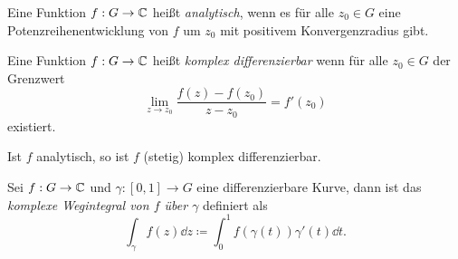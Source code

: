 \begin{definition}
    Eine Funktion $f : G \to \mathbb{C}$ heißt \emph{analytisch}, wenn es für alle $z_0 \in G$ eine Potenzreihenentwicklung von $f$ um $z_0$ mit positivem Konvergenzradius gibt.

    Eine Funktion $f : G \to \mathbb{C}$ heißt \emph{komplex differenzierbar} wenn für alle $z_0 \in G$ der Grenzwert
    $$ \lim_{z \to z_0} \frac{f(z) - f(z_0)}{z - z_0} = f'(z_0) $$
    existiert.
\end{definition}

\begin{remark}
    Ist $f$ analytisch, so ist $f$ (stetig) komplex differenzierbar.
\end{remark}

\begin{definition}
    Sei $f : G \to \mathbb{C}$ und $\gamma : [0,1] \to G$ eine differenzierbare Kurve, dann ist das \emph{komplexe Wegintegral von $f$ über $\gamma$} definiert als
    $$ \int_\gamma f(z) \dd z \coloneqq \int_0^1 f(\gamma(t)) \gamma'(t) \dd t. $$
\end{definition}

